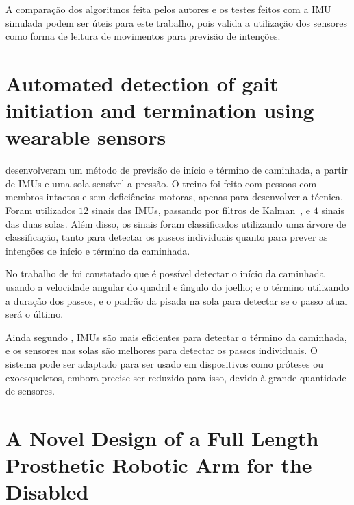 A comparação dos algoritmos feita pelos autores  e os testes feitos com a IMU simulada podem ser úteis para este trabalho, pois valida a utilização dos sensores como forma de leitura de movimentos para previsão de intenções.


\section{Automated detection of gait initiation and termination using wearable sensors}\label{sec:rel_novak}

 desenvolveram um método de previsão de início e término de caminhada, a partir de IMUs e uma sola sensível a pressão. O treino foi feito com pessoas com membros intactos e sem deficiências motoras, apenas para desenvolver a técnica. Foram utilizados \(12\) sinais das IMUs, passando por filtros de Kalman~\cite{kalman:1960}, e \(4\) sinais das duas solas. Além disso, os sinais foram classificados utilizando uma árvore de classificação, tanto para detectar os passos individuais quanto para prever as intenções de início e término da caminhada.

No trabalho de  foi constatado que é possível detectar o início da caminhada usando a velocidade angular do quadril e ângulo do joelho; e o término utilizando a duração dos passos, e o padrão da pisada na sola para detectar se o passo atual será o último.

Ainda segundo , IMUs são mais eficientes para detectar o término da caminhada, e os sensores nas solas são melhores para detectar os passos individuais. O sistema pode ser adaptado para ser usado em dispositivos como próteses ou exoesqueletos, embora precise ser reduzido para isso, devido à grande quantidade de sensores.


\section{A Novel Design of a Full Length Prosthetic Robotic Arm for the Disabled}\label{sec:rel_kumar}

